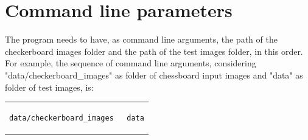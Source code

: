 \documentclass{article}
\begin{document}
\section{Command line parameters}
The program needs to have, as command line arguments, the path of the checkerboard images folder and the path of the test images folder, in this order. For example, the sequence of command line arguments, considering "data/checkerboard\_images" as folder of chessboard input images and "data" as folder of test images, is:\\
\begin{center}
\begin{tabular}{c}
\begin{lstlisting}[linewidth=160pt, basicstyle=\footnotesize\sffamily,] 
data/checkerboard_images   data
\end{lstlisting}
\end{tabular}
\end{center}
\end{document}
